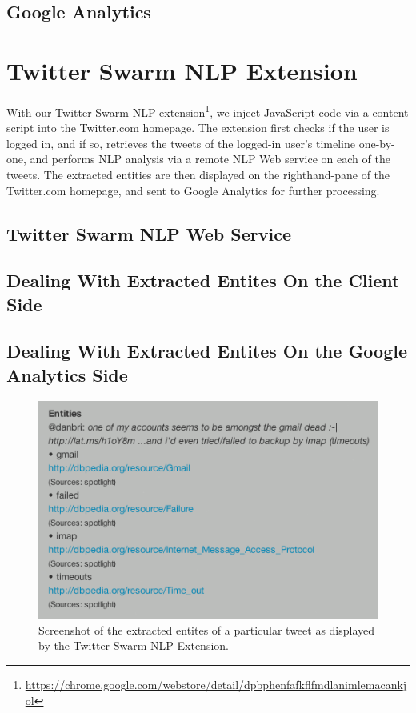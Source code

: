 \documentclass[runningheads,a4paper]{llncs}
\begin{document}
\subsection{Google Analytics}
 
\section{Twitter Swarm NLP Extension}
With our Twitter Swarm NLP extension\footnote{\url{https://chrome.google.com/webstore/detail/dpbphenfafkflfmdlanimlemacankjol}}, we inject JavaScript code via a content script into the Twitter.com homepage. The extension first checks if the user is logged in, and if so, retrieves the tweets of the logged-in user's timeline one-by-one, and performs NLP analysis via a remote NLP Web service on each of the tweets. The extracted entities are then displayed on the righthand-pane of the Twitter.com homepage, and sent to Google Analytics for further processing.

\subsection{Twitter Swarm NLP Web Service}
\subsection{Dealing With Extracted Entites On the Client Side}
\subsection{Dealing With Extracted Entites On the Google Analytics Side}

\begin{figure}[h!]
  \centering
  \includegraphics[width=0.6\linewidth]{danbri.png}
  \caption{Screenshot of the extracted entites of a particular tweet as displayed by the Twitter Swarm NLP Extension.}
  \label{fig:dataflow}
\end{figure}
\end{document}
